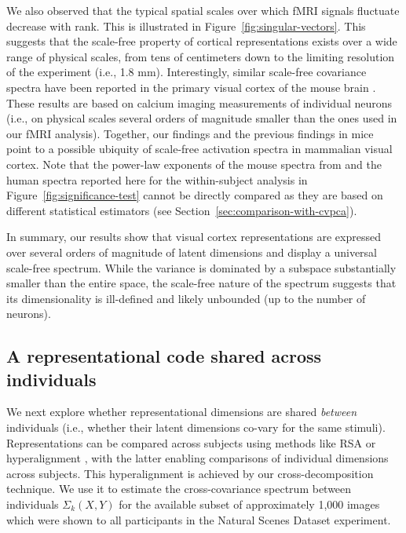 \documentclass[10pt]{article}
\begin{document}
We also observed that the typical spatial scales over which fMRI signals fluctuate decrease with rank. This is illustrated in Figure~\ref{fig:singular-vectors}. This suggests that the scale-free property of cortical representations exists over a wide range of physical scales, from tens of centimeters down to the limiting resolution of the experiment (i.e., 1.8 mm). Interestingly, similar scale-free covariance spectra have been reported in the primary visual cortex of the mouse brain \autocite{Stringer2019}. These results are based on calcium imaging measurements of individual neurons (i.e., on physical scales several orders of magnitude smaller than the ones used in our fMRI analysis). Together, our findings and the previous findings in mice point to a possible ubiquity of scale-free activation spectra in mammalian visual cortex. Note that the power-law exponents of the mouse spectra from \textcite{Stringer2019} and the human spectra reported here for the within-subject analysis in Figure~\ref{fig:significance-test} cannot be directly compared as they are based on different statistical estimators (see Section~\ref{sec:comparison-with-cvpca}).

In summary, our results show that visual cortex representations are expressed over several orders of magnitude of latent dimensions and display a universal scale-free spectrum. While the variance is dominated by a subspace substantially smaller than the entire space, the scale-free nature of the spectrum suggests that its dimensionality is ill-defined and likely unbounded (up to the number of neurons).

\subsection{A representational code shared across individuals}\label{a-representational-code-shared-across-individuals}

We next explore whether representational dimensions are shared \emph{between} individuals (i.e., whether their latent dimensions co-vary for the same stimuli). Representations can be compared across subjects using methods like RSA \autocite{Kriegeskorte2008} or hyperalignment \autocite{Haxby2011}, with the latter enabling comparisons of individual dimensions across subjects. This hyperalignment is achieved by our cross-decomposition technique. We use it to estimate the cross-covariance spectrum between individuals \(\Sigma_k(X, Y)\) for the available subset of approximately 1,000 images which were shown to all participants in the Natural Scenes Dataset experiment.
\end{document}
